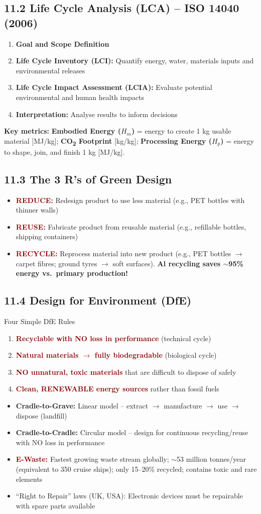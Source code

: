\documentclass[11pt,a4paper]{article}
\newcommand{\mysubsec}[1]{\subsection*{#1}}
\newcommand{\CRIT}[1]{\textcolor{DarkRed}{\textbf{#1}}}
\newcommand{\KEY}[1]{\textcolor{SecondaryDark}{\textbf{#1}}}
\newcommand{\HI}[1]{\colorbox{yellow!20}{\textcolor{DarkPurple}{\textbf{#1}}}}
\begin{document}
\mysubsec{11.2 Life Cycle Analysis (LCA) -- ISO 14040 (2006)}
\begin{enumerate}[leftmargin=*,nosep]
    \item \KEY{Goal and Scope Definition}
    \item \KEY{Life Cycle Inventory (LCI):} Quantify energy, water, materials inputs and environmental releases
    \item \KEY{Life Cycle Impact Assessment (LCIA):} Evaluate potential environmental and human health impacts
    \item \KEY{Interpretation:} Analyse results to inform decisions
\end{enumerate}
\textbf{Key metrics:} \KEY{Embodied Energy ($H_m$)} = energy to create 1 kg usable material [MJ/kg]; \KEY{CO\textsubscript{2} Footprint} [kg/kg]; \KEY{Processing Energy ($H_p$)} = energy to shape, join, and finish 1 kg [MJ/kg].

\mysubsec{11.3 The 3 R's of Green Design}
\begin{itemize}[leftmargin=*,nosep]
    \item \CRIT{REDUCE:} Redesign product to use less material (e.g., PET bottles with thinner walls)
    \item \CRIT{REUSE:} Fabricate product from reusable material (e.g., refillable bottles, shipping containers)
    \item \CRIT{RECYCLE:} Reprocess material into new product (e.g., PET bottles $\to$ carpet fibres; ground tyres $\to$ soft surfaces). \HI{Al recycling saves $\sim$95\% energy vs.\ primary production!}
\end{itemize}

\mysubsec{11.4 Design for Environment (DfE)}
\begin{impbox}{Four Simple DfE Rules}
\begin{enumerate}[leftmargin=*,nosep]
    \item \CRIT{Recyclable with NO loss in performance} (technical cycle)
    \item \CRIT{Natural materials $\to$ fully biodegradable} (biological cycle)
    \item \CRIT{NO unnatural, toxic materials} that are difficult to dispose of safely
    \item \CRIT{Clean, RENEWABLE energy sources} rather than fossil fuels
\end{enumerate}
\end{impbox}

\begin{itemize}[leftmargin=*,nosep]
    \item \textbf{Cradle-to-Grave:} Linear model -- extract $\to$ manufacture $\to$ use $\to$ dispose (landfill)
    \item \textbf{Cradle-to-Cradle:} Circular model -- design for continuous recycling/reuse with NO loss in performance
    \item \CRIT{E-Waste:} Fastest growing waste stream globally; $\sim$53 million tonnes/year (equivalent to 350 cruise ships); only 15--20\% recycled; contains toxic and rare elements
    \item ``Right to Repair'' laws (UK, USA): Electronic devices must be repairable with spare parts available
\end{itemize}
\end{document}
